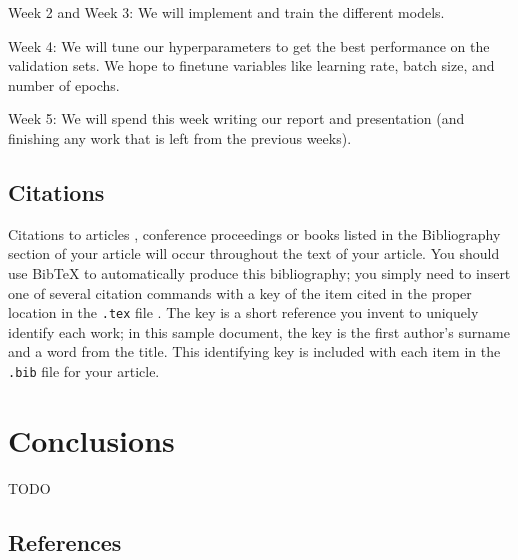 \documentclass{sig-alternate-05-2015}
\begin{document}
Week 2 and Week 3: We will implement and train the different models.

Week 4: We will tune our hyperparameters to get the best performance on the validation sets. We hope to finetune variables like learning rate, batch size, and number of epochs.

Week 5: We will spend this week writing our report and presentation (and finishing any work that is left from the previous weeks).

\subsection{Citations}
Citations to articles \cite{bowman:reasoning,
clark:pct, braams:babel, herlihy:methodology},
conference proceedings \cite{clark:pct} or
books \cite{salas:calculus, Lamport:LaTeX} listed
in the Bibliography section of your
article will occur throughout the text of your article.
You should use BibTeX to automatically produce this bibliography;
you simply need to insert one of several citation commands with
a key of the item cited in the proper location in
the \texttt{.tex} file \cite{Lamport:LaTeX}.
The key is a short reference you invent to uniquely
identify each work; in this sample document, the key is
the first author's surname and a
word from the title.  This identifying key is included
with each item in the \texttt{.bib} file for your article.

\section{Conclusions}

TODO


%

%
\subsection{References}
\end{document}
